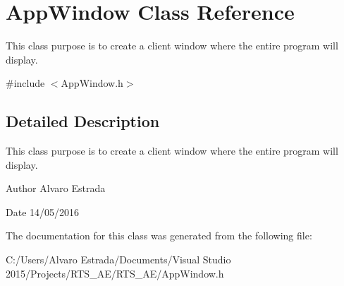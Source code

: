\hypertarget{class_app_window}{}\section{App\+Window Class Reference}
\label{class_app_window}


This class purpose is to create a client window where the entire program will display.  




{\ttfamily \#include $<$App\+Window.\+h$>$}



\subsection{Detailed Description}
This class purpose is to create a client window where the entire program will display. 

\begin{DoxyAuthor}{Author}
Alvaro Estrada 
\end{DoxyAuthor}
\begin{DoxyDate}{Date}
14/05/2016 
\end{DoxyDate}


The documentation for this class was generated from the following file\+:\begin{DoxyCompactItemize}
\item 
C\+:/\+Users/\+Alvaro Estrada/\+Documents/\+Visual Studio 2015/\+Projects/\+R\+T\+S\+\_\+\+A\+E/\+R\+T\+S\+\_\+\+A\+E/App\+Window.\+h\end{DoxyCompactItemize}
